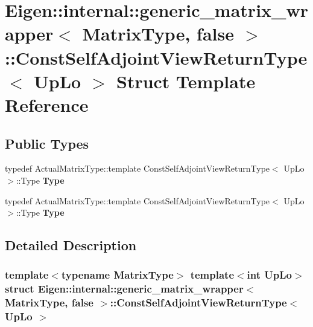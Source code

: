 \hypertarget{struct_eigen_1_1internal_1_1generic__matrix__wrapper_3_01_matrix_type_00_01false_01_4_1_1_const_self_adjoint_view_return_type}{}\section{Eigen\+:\+:internal\+:\+:generic\+\_\+matrix\+\_\+wrapper$<$ Matrix\+Type, false $>$\+:\+:Const\+Self\+Adjoint\+View\+Return\+Type$<$ Up\+Lo $>$ Struct Template Reference}
\label{struct_eigen_1_1internal_1_1generic__matrix__wrapper_3_01_matrix_type_00_01false_01_4_1_1_const_self_adjoint_view_return_type}
\subsection*{Public Types}
\begin{DoxyCompactItemize}
\item 
\mbox{\label{struct_eigen_1_1internal_1_1generic__matrix__wrapper_3_01_matrix_type_00_01false_01_4_1_1_const_self_adjoint_view_return_type_a58add0965fe42d8fa8c17f322b6cbc4e}} 
typedef Actual\+Matrix\+Type\+::template Const\+Self\+Adjoint\+View\+Return\+Type$<$ Up\+Lo $>$\+::Type {\bfseries Type}
\item 
\mbox{\label{struct_eigen_1_1internal_1_1generic__matrix__wrapper_3_01_matrix_type_00_01false_01_4_1_1_const_self_adjoint_view_return_type_a58add0965fe42d8fa8c17f322b6cbc4e}} 
typedef Actual\+Matrix\+Type\+::template Const\+Self\+Adjoint\+View\+Return\+Type$<$ Up\+Lo $>$\+::Type {\bfseries Type}
\end{DoxyCompactItemize}


\subsection{Detailed Description}
\subsubsection*{template$<$typename Matrix\+Type$>$\newline
template$<$int Up\+Lo$>$\newline
struct Eigen\+::internal\+::generic\+\_\+matrix\+\_\+wrapper$<$ Matrix\+Type, false $>$\+::\+Const\+Self\+Adjoint\+View\+Return\+Type$<$ Up\+Lo $>$}



